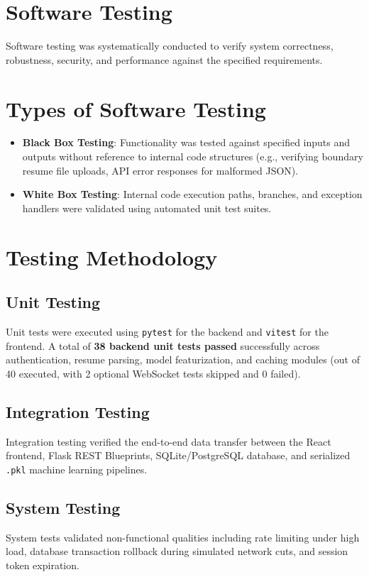 \documentclass[12pt,a4paper]{report}
\begin{document}
\section{Software Testing}
Software testing was systematically conducted to verify system correctness, robustness, security, and performance against the specified requirements.

\section{Types of Software Testing}
\begin{itemize}
    \item \textbf{Black Box Testing}: Functionality was tested against specified inputs and outputs without reference to internal code structures (e.g., verifying boundary resume file uploads, API error responses for malformed JSON).
    \item \textbf{White Box Testing}: Internal code execution paths, branches, and exception handlers were validated using automated unit test suites.
\end{itemize}

\section{Testing Methodology}
\subsection{Unit Testing}
Unit tests were executed using \texttt{pytest} for the backend and \texttt{vitest} for the frontend. A total of \textbf{38 backend unit tests passed} successfully across authentication, resume parsing, model featurization, and caching modules (out of 40 executed, with 2 optional WebSocket tests skipped and 0 failed).

\subsection{Integration Testing}
Integration testing verified the end-to-end data transfer between the React frontend, Flask REST Blueprints, SQLite/PostgreSQL database, and serialized \texttt{.pkl} machine learning pipelines.

\subsection{System Testing}
System tests validated non-functional qualities including rate limiting under high load, database transaction rollback during simulated network cuts, and session token expiration.
\end{document}

